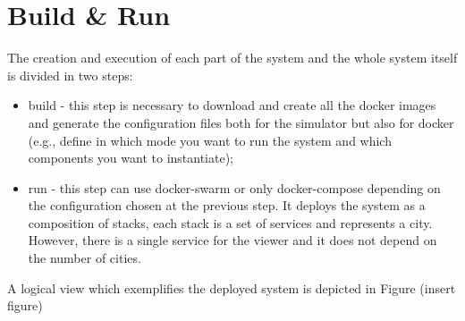 \section{Build \& Run}
The creation and execution of each part of the system and
the whole system itself is divided in two steps:

\begin{itemize}
   \item build - this step is necessary to download and create all the docker
   images and generate the configuration files both for the simulator but
   also for docker (e.g., define in which mode you want to run the system and
   which components you want to instantiate);
   \item run - this step can use docker-swarm or only docker-compose depending
   on the configuration chosen at the previous step. It deploys the system
   as a composition of stacks, each stack is a set of services and represents
   a city. However, there is a single service for the viewer and it does not
   depend on the number of cities.
\end{itemize}

A logical view which exemplifies the deployed system is depicted in Figure (insert figure)